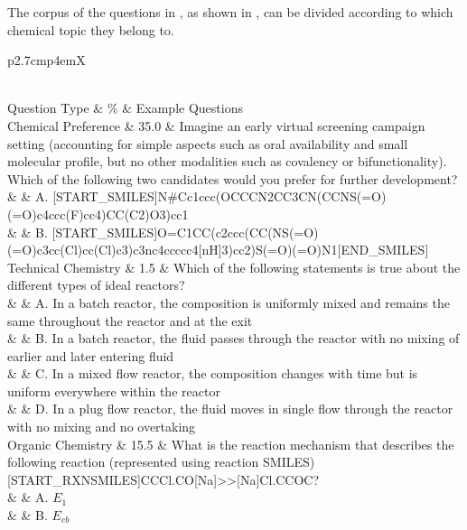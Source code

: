 The corpus of the questions in \chembench, as shown in , can be divided according to which chemical topic they belong to.

\begin{xltabular}{\textwidth}{p{2.7cm}p{4em}X}
        \caption{\textbf{Examples for each of the topics considered in the evaluation of the \chembench corpus.} The table shows the percentage of questions in the corpus that belong to each topic, as well as example questions.} \\

        \toprule
        Question Type & \% & Example Questions  \\
        \midrule
        Chemical Preference & 35.0 & Imagine an early virtual screening campaign setting (accounting for simple aspects such as oral availability and small molecular profile, but no other modalities such as covalency or bifunctionality). Which of the following two candidates would you prefer for further development? \\
        & & A. [START\_SMILES]N\#Cc1ccc(OCCCN2CC3CN\-(CCNS(=O)(=O)c4ccc(F)cc4)CC(C2)O3)cc1 \\
        & & B. [START\_SMILES]O=C1CC(c2ccc(CC(NS(=O)\-(=O)\-c3cc(Cl)cc(Cl)c3)c3nc4ccccc4[nH]3)cc2)S\-(=O)\-(=O)N1[END\_SMILES] \\
        \midrule
        Technical Chemistry & 1.5 & Which of the following statements is true about the different types of ideal reactors? \\
        & & A. In a batch reactor, the composition is uniformly mixed and remains the same throughout the reactor and at the exit \\
        & & B. In a batch reactor, the fluid passes through the reactor with no mixing of earlier and later entering fluid \\
        & & C. In a mixed flow reactor, the composition changes with time but is uniform everywhere within the reactor \\
        & & D. In a plug flow reactor, the fluid moves in single flow through the reactor with no mixing and no overtaking \\
        \midrule
        Organic Chemistry & 15.5 & What is the reaction mechanism that describes the following reaction (represented using reaction SMILES) [START\_RXNSMILES]CCCl.CO[Na]>>[Na]Cl.CCOC? \\
        & & A. $E_1$ \\
        & & B. $E_{cb}$ \\

\end{xltabular}
